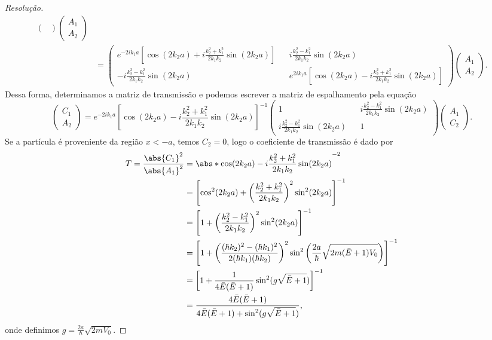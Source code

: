 \begin{proof}[Resolução]
\begin{align*}
\begin{pmatrix}
        \end{pmatrix}
        \begin{pmatrix}
            A_1\\
            A_2
        \end{pmatrix}\\
        &= \begin{pmatrix}
            e^{-2ik_1 a} \left[\cos(2k_2a) + i\frac{k_2^2 + k_1^2}{2k_1k_2} \sin(2k_2a)\right]&& i\frac{k_2^2 - k_1^2}{2k_1k_2} \sin(2k_2 a)\\
            -i\frac{k_2^2 - k_1^2}{2k_1k_2}\sin(2k_2 a) && e^{2ik_1 a} \left[\cos(2k_2a) - i\frac{k_2^2 + k_1^2}{2k_1k_2} \sin(2k_2a)\right]
        \end{pmatrix}
        \begin{pmatrix}
            A_1\\
            A_2
        \end{pmatrix}.
    \end{align*}
    Dessa forma, determinamos a matriz de transmissão e podemos escrever a matriz de espalhamento pela equação
    \begin{equation*}
        \begin{pmatrix}
            C_1 \\
            A_2
        \end{pmatrix} =
        e^{-2ik_1 a} \left[\cos(2k_2a) - i\frac{k_2^2 + k_1^2}{2k_1k_2} \sin(2k_2a)\right]^{-1} \begin{pmatrix}
            1 && i\frac{k_2^2 - k_1^2}{2k_1k_2} \sin(2k_2 a)\\
            i\frac{k_2^2 - k_1^2}{2k_1k_2} \sin(2k_2 a) && 1
        \end{pmatrix}
        \begin{pmatrix}
            A_1 \\
            C_2
        \end{pmatrix}.
    \end{equation*}
    Se a partícula é proveniente da região \(x < -a\), temos \(C_2 = 0\), logo o coeficiente de transmissão é dado por
    \begin{align*}
        T = \frac{\abs{C_1}^2}{\abs{A_1}^2}
        &= \abs*{\cos(2k_2a) - i\frac{k_2^2 + k_1^2}{2k_1k_2} \sin(2k_2a)}^{-2}\\
        &= \left[\cos^2(2k_2 a) + \left(\frac{k_2^2 + k_1^2}{2k_1k_2}\right)^2 \sin^2(2k_2a)\right]^{-1}\\
        &= \left[1 + \left(\frac{k_2^2 - k_1^2}{2k_1k_2}\right)^2\sin^2(2k_2 a)\right]^{-1}\\
        &= \left[1 + \left(\frac{(\hbar k_2)^2 - (\hbar k_1)^2}{2(\hbar k_1)(\hbar k_2)}\right)^2\sin^2 \left(\frac{2a}{\hbar}\sqrt{2m(\bar{E} + 1)V_0}\right)\right]^{-1}\\
        &= \left[1 + \frac{1}{4\bar{E}(\bar{E}+1)}\sin^2(g\sqrt{\bar{E}+1})\right]^{-1}\\
        &= \frac{4 \bar{E}(\bar{E}+1)}{4\bar{E}(\bar{E} + 1) + \sin^2(g\sqrt{\bar{E} + 1})},
    \end{align*}
    onde definimos \(g = \frac{2a}{\hbar}\sqrt{2m V_0}\).


\end{proof}

